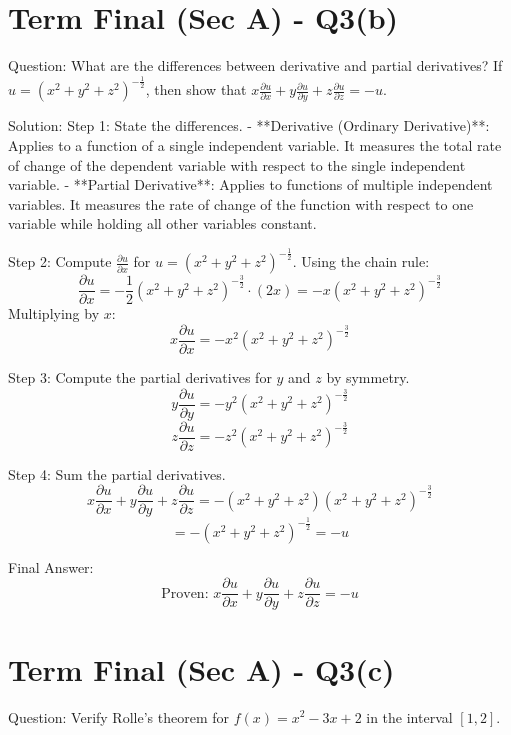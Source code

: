 \documentclass[11pt, a4paper]{article}
\begin{document}
\section*{Term Final (Sec A) - Q3(b)}
Question:
What are the differences between derivative and partial derivatives? If $u = (x^2 + y^2 + z^2)^{-\frac{1}{2}}$, then show that $x\frac{\partial u}{\partial x} + y\frac{\partial u}{\partial y} + z\frac{\partial u}{\partial z} = -u$.

Solution:
Step 1: State the differences.
- **Derivative (Ordinary Derivative)**: Applies to a function of a single independent variable. It measures the total rate of change of the dependent variable with respect to the single independent variable.
- **Partial Derivative**: Applies to functions of multiple independent variables. It measures the rate of change of the function with respect to one variable while holding all other variables constant.

Step 2: Compute $\frac{\partial u}{\partial x}$ for $u = (x^2 + y^2 + z^2)^{-\frac{1}{2}}$.
Using the chain rule:
$$\frac{\partial u}{\partial x} = -\frac{1}{2}(x^2+y^2+z^2)^{-\frac{3}{2}} \cdot (2x) = -x(x^2+y^2+z^2)^{-\frac{3}{2}}$$
Multiplying by $x$:
$$x\frac{\partial u}{\partial x} = -x^2 (x^2+y^2+z^2)^{-\frac{3}{2}}$$

Step 3: Compute the partial derivatives for $y$ and $z$ by symmetry.
$$y\frac{\partial u}{\partial y} = -y^2 (x^2+y^2+z^2)^{-\frac{3}{2}}$$
$$z\frac{\partial u}{\partial z} = -z^2 (x^2+y^2+z^2)^{-\frac{3}{2}}$$

Step 4: Sum the partial derivatives.
$$x\frac{\partial u}{\partial x} + y\frac{\partial u}{\partial y} + z\frac{\partial u}{\partial z} = -(x^2+y^2+z^2)(x^2+y^2+z^2)^{-\frac{3}{2}}$$
$$= -(x^2+y^2+z^2)^{-\frac{1}{2}} = -u$$

Final Answer:
$$
\boxed{\text{Proven: } x\frac{\partial u}{\partial x} + y\frac{\partial u}{\partial y} + z\frac{\partial u}{\partial z} = -u}
$$


\section*{Term Final (Sec A) - Q3(c)}
Question:
Verify Rolle's theorem for $f(x) = x^2 - 3x + 2$ in the interval $[1,2]$.
\end{document}
